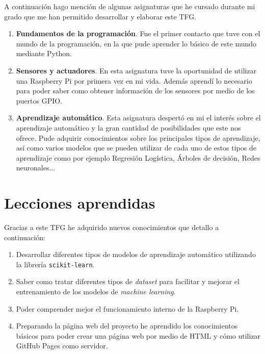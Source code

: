 \documentclass[a4paper, 12pt]{book}
\begin{document}
A continuación hago mención de algunas asignaturas que he cursado durante mi grado que me han permitido desarrollar y elaborar este TFG.

\begin{enumerate}
    \item \textbf{Fundamentos de la programación}. Fue el primer contacto que tuve con el mundo de la programación, en la que pude aprender lo básico de este mundo mediante Python.

    \item \textbf{Sensores y actuadores}. En esta asignatura tuve la oportunidad de utilizar una Raspberry Pi por primera vez en mi vida. Además aprendí lo necesario para poder saber como obtener información de los sensores por medio de los puertos GPIO.
    
    \item \textbf{Aprendizaje automático}. Esta asignatura despertó en mi el interés sobre el aprendizaje automático y la gran cantidad de posibilidades que este nos ofrece. Pude adquirir conocimientos sobre los principales tipos de aprendizaje, así como varios modelos que se pueden utilizar de cada uno de estos tipos de aprendizaje como por ejemplo Regresión Logística, Árboles de decisión, Redes neuronales...

\end{enumerate}


\section{Lecciones aprendidas}
\label{sec:lecciones_aprendidas}

Gracias a este TFG he adquirido nuevos conocimientos que detallo a continuación:

\begin{enumerate}
  \item Desarrollar diferentes tipos de modelos de aprendizaje automático utilizando la librería \texttt{scikit-learn}.
  \item Saber como tratar diferentes tipos de \textit{dataset} para facilitar y mejorar el entrenamiento de los modelos de \textit{machine learning}.
  \item Poder comprender mejor el funcionamiento interno de la Raspberry Pi.
  \item Preparando la página web del proyecto he aprendido los conocimientos básicos para poder crear una página web por medio de HTML y cómo utilizar GitHub Pages como servidor.
\end{enumerate} 
\end{document}
